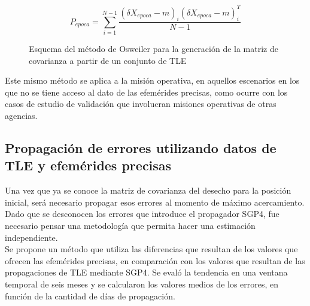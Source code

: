 {\begin{equation}
 P_{epoca}=\sum_{i=1}^{N-1} \frac{(\delta X_{epoca}-m)_{i}(\delta X_{epoca}-m)_{i}^{T}}{N-1}
\end{equation}

\begin{figure}[!h]
\centering
{}
\caption[M\'etodo de Osweiler para la generaci\'on de la matriz de covarianza]{Esquema del m\'etodo de Osweiler \citep{osweiler} para la generaci\'on de la matriz de covarianza a partir de un conjunto de TLE}
\label{fig:tleosw}
\end{figure}

Este mismo m\'etodo se aplica a la misi\'on operativa, en aquellos escenarios en los que no se tiene acceso al dato de las efem\'erides precisas, como ocurre con los casos de estudio de validaci\'on que involucran misiones operativas de otras agencias.\\

\subsection{Propagaci\'on de errores utilizando datos de TLE y efem\'erides precisas}\label{subsec:tablaprop}
Una vez que ya se conoce la matriz de covarianza del desecho para la posici\'on inicial, ser\'a necesario propagar esos errores al momento de m\'aximo acercamiento.\\
Dado que se desconocen los errores que introduce el propagador SGP4, fue necesario pensar una metodolog\'ia que permita hacer una estimaci\'on independiente.\\
Se propone un m\'etodo que utiliza las diferencias que resultan de los valores que ofrecen las efem\'erides precisas, en comparaci\'on con los valores que resultan de las propagaciones de TLE mediante SGP4. Se eval\'o la tendencia en una ventana temporal de seis meses y se calcularon los valores medios de los errores, en funci\'on de la cantidad de d\'ias de propagaci\'on.

}
